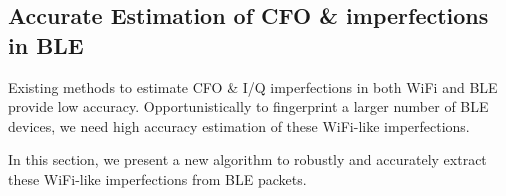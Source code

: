 


\subsection{Accurate Estimation of CFO \& \iq imperfections in BLE} %
\label{sec:methodology1}

Existing methods to estimate CFO \& I/Q imperfections in both WiFi and BLE provide low accuracy.
%
Opportunistically to fingerprint a larger number of BLE devices, we need high accuracy estimation of these WiFi-like imperfections.
%

In this section, we present a new algorithm to robustly and accurately extract these WiFi-like imperfections from BLE packets.

